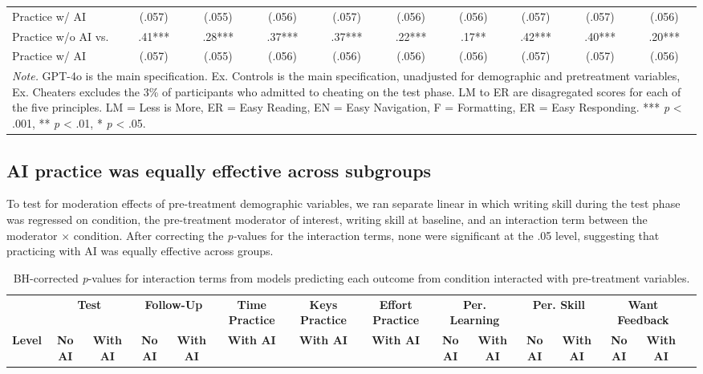 \documentclass[11pt]{report}
\begin{document}
\begin{append}
\begin{table}[h]
\begin{tabular}{lccccccccc}
Practice w/ AI & (.057) & (.055) & (.056) & (.057) & (.056) & (.056) & (.057) & (.057) & (.056) \\ 
Practice w/o AI vs.  & .41*** & .28*** & .37*** & .37*** & .22*** & .17** & .42*** & .40*** & .20*** \\ 
 Practice w/ AI& (.057) & (.055) & (.056) & (.056) & (.056) & (.056) & (.057) & (.057) & (.056) \\ 
\midrule
\multicolumn{10}{p{15cm}}{\textit{Note.} GPT-4o is the main specification. Ex. Controls is the main specification, unadjusted for demographic and pretreatment variables, Ex. Cheaters excludes the 3\% of participants who admitted to cheating on the test phase. LM to ER are disagregated scores for each of the five principles. LM = Less is More, ER = Easy Reading, EN = Easy Navigation, F = Formatting, ER = Easy Responding. *** \textit{p} < .001, ** \textit{p} < .01, * \textit{p} < .05.}
\vspace{5pt}
\end{tabular}
    \label{tab:s2_followup}
\end{table}

\subsection{AI practice was equally effective across subgroups}

To test for moderation effects of pre-treatment demographic variables, we ran separate linear in which writing skill during the test phase was regressed on condition, the pre-treatment moderator of interest, writing skill at baseline, and an interaction term between the moderator $\times$ condition. After correcting the \textit{p-}values for the interaction terms, none were significant at the .05 level, suggesting that practicing with AI was equally effective across groups.

\begin{landscape}
\begin{table}[h]
    \centering
    \footnotesize
    \caption{BH-corrected \textit{p}-values for interaction terms from models predicting each outcome from condition interacted with pre-treatment variables.}
    \label{tab:interactions2}
        \begin{tabular}{@{\extracolsep{-4pt}}lcccccccccccccc}
    \toprule
    & \multicolumn{2}{c}{\textbf{Test}} & \multicolumn{2}{c}{\textbf{Follow-Up}} & \textbf{Time Practice} & \textbf{Keys Practice} & \textbf{Effort Practice} & \multicolumn{2}{c}{\textbf{Per. Learning}} & \multicolumn{2}{c}{\textbf{Per. Skill}} & \multicolumn{2}{c}{\textbf{Want Feedback}} \\ 
    \cmidrule(lr){2-3} \cmidrule(lr){4-5} \cmidrule(lr){6-6} \cmidrule(lr){7-7} \cmidrule(lr){8-8} \cmidrule(lr){9-10} \cmidrule(lr){11-12} \cmidrule(lr){13-14}
    \textbf{Level} & \textbf{No AI} & \textbf{With AI} & \textbf{No AI} & \textbf{With AI} & \textbf{With AI} & \textbf{With AI} & \textbf{With AI} & \textbf{No AI} & \textbf{With AI} & \textbf{No AI} & \textbf{With AI} & \textbf{No AI} & \textbf{With AI} \\ 
    \midrule
    

\end{tabular}
\end{table}
\end{landscape}
\end{append}
\end{document}
